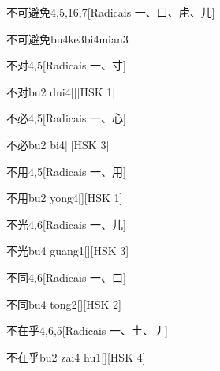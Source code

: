 \begin{entry}{不可避免}{4,5,16,7}[Radicais ⼀、⼝、⾌、⼉]
  \begin{phonetics}{不可避免}{bu4ke3bi4mian3}
  \end{phonetics}
\end{entry}

\begin{entry}{不对}{4,5}[Radicais ⼀、⼨]
  \begin{phonetics}{不对}{bu2 dui4}[][HSK 1]
  \end{phonetics}
\end{entry}

\begin{entry}{不必}{4,5}[Radicais ⼀、⼼]
  \begin{phonetics}{不必}{bu2 bi4}[][HSK 3]
  \end{phonetics}
\end{entry}

\begin{entry}{不用}{4,5}[Radicais ⼀、⽤]
  \begin{phonetics}{不用}{bu2 yong4}[][HSK 1]
  \end{phonetics}
\end{entry}

\begin{entry}{不光}{4,6}[Radicais ⼀、⼉]
  \begin{phonetics}{不光}{bu4 guang1}[][HSK 3]
  \end{phonetics}
\end{entry}

\begin{entry}{不同}{4,6}[Radicais ⼀、⼝]
  \begin{phonetics}{不同}{bu4 tong2}[][HSK 2]
  \end{phonetics}
\end{entry}

\begin{entry}{不在乎}{4,6,5}[Radicais ⼀、⼟、⼃]
  \begin{phonetics}{不在乎}{bu2 zai4 hu1}[][HSK 4]
  \end{phonetics}
\end{entry}

